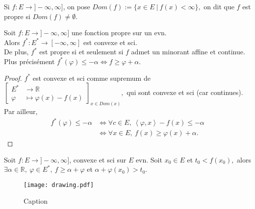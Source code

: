 Si $f:E\to ]-\infty ,\infty ]$, on pose $Dom(f):=\{x\in E\ |\ f(x)<\infty \} ,$ on dit que $f$ est propre si $Dom(f)\neq \emptyset .$

\begin{lemme}
    Soit $f:E\to ]-\infty ,\infty ]$ une fonction propre sur un evn.\\
    Alors $f^*:E^*\to [-\infty ,\infty ]$ est convexe et sci.\\
    De plus, $f^*$ est propre si et seulement si $f$ admet un minorant affine et continue. Plus précisément $f^*(\varphi )\le -\alpha \Leftrightarrow f\ge \varphi +\alpha .$
\end{lemme}
\begin{proof}
    $f^*$ est convexe et sci comme supremum de $\left[ \begin{aligned}
        E^* &\longrightarrow \mathbb{R}  \\
        \varphi  &\longmapsto \varphi (x)-f(x)
    \end{aligned} \right]_{x\in Dom(x)} ,$ qui sont convexe et sci (car continues). Par ailleur,
    \begin{align*}
        f^*(\varphi )\le -\alpha &\Leftrightarrow \forall c\in E,\ \left<\varphi ,x \right>- f(x)\le -\alpha \\
                                 &\Leftrightarrow \forall x\in E,\ f(x)\ge \varphi (x)+\alpha .
    \end{align*}
\end{proof}
\begin{lemme}
    Soit $f:E\to ]-\infty ,\infty ]$, convexe et sci sur $E$ evn. Soit $x_0\in E$ et $t_0<f(x_0),$ alors $\exists \alpha \in \mathbb{R} ,\ \varphi \in E^*,\ f\ge \alpha +\varphi $ et $\alpha +\varphi (x_0)>t_0.$
\end{lemme}

\begin{figure}[H]
    \centering
    \texttt{[image: drawing.pdf]}
    \caption{Caption}
    \label{fig:enter-label}
\end{figure}

